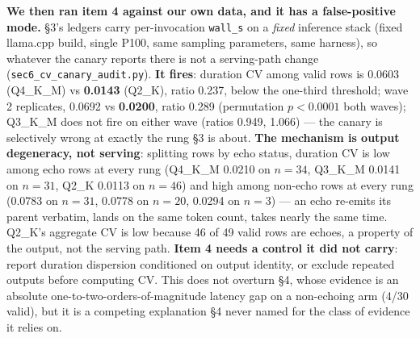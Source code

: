 \begin{enumerate}
\textbf{We then ran item 4 against our own data, and it has a false-positive mode.} \S3's ledgers carry per-invocation \texttt{wall\_s} on a \emph{fixed} inference stack (fixed llama.cpp build, single P100, same sampling parameters, same harness), so whatever the canary reports there is not a serving-path change (\texttt{sec6\_cv\_canary\_audit.py}). \textbf{It fires}: duration CV among valid rows is 0.0603 (Q4\_K\_M) vs \textbf{0.0143} (Q2\_K), ratio 0.237, below the one-third threshold; wave 2 replicates, 0.0692 vs \textbf{0.0200}, ratio 0.289 (permutation $p < 0.0001$ both waves); Q3\_K\_M does not fire on either wave (ratios 0.949, 1.066) --- the canary is selectively wrong at exactly the rung \S3 is about. \textbf{The mechanism is output degeneracy, not serving}: splitting rows by echo status, duration CV is low among echo rows at every rung (Q4\_K\_M 0.0210 on $n=34$, Q3\_K\_M 0.0141 on $n=31$, Q2\_K 0.0113 on $n=46$) and high among non-echo rows at every rung (0.0783 on $n=31$, 0.0778 on $n=20$, 0.0294 on $n=3$) --- an echo re-emits its parent verbatim, lands on the same token count, takes nearly the same time. Q2\_K's aggregate CV is low because 46 of 49 valid rows are echoes, a property of the output, not the serving path. \textbf{Item 4 needs a control it did not carry}: report duration dispersion conditioned on output identity, or exclude repeated outputs before computing CV. This does not overturn \S4, whose evidence is an absolute one-to-two-orders-of-magnitude latency gap on a non-echoing arm (4/30 valid), but it is a competing explanation \S4 never named for the class of evidence it relies on.


\end{enumerate}

